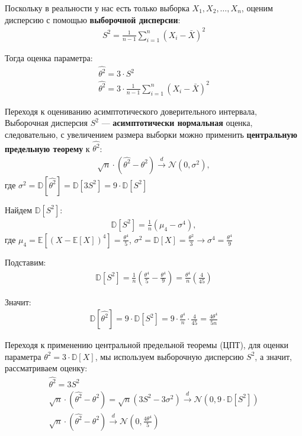 \documentclass[12pt]{article}
\begin{document}
	Поскольку в реальности у нас есть только выборка $ X_1, X_2, \dots, X_n $, оценим дисперсию с помощью \textbf{выборочной дисперсии}:
	\begin{gather*}
		S^2 = \frac{1}{n-1} \sum_{i=1}^{n} (X_i - \bar{X})^2
	\end{gather*}
	
	Тогда оценка параметра:
	\begin{gather*}
		\widehat{\theta^2} = 3 \cdot S^2 \\
		\widehat{\theta^2} = 3 \cdot \frac{1}{n-1} \sum_{i=1}^{n} (X_i - \bar{X})^2
	\end{gather*}
	
	Переходя к оцениванию асимптотического доверительного интервала, Выборочная дисперсия $ S^2 $ — \textbf{асимптотически нормальная} оценка, следовательно, с увеличением размера выборки можно применить \textbf{центральную предельную теорему} к $ \widehat{\theta^2} $:
	\begin{gather*}
		\sqrt{n} \cdot \left( \widehat{\theta^2} - \theta^2 \right) \overset{d}{\longrightarrow} \mathcal{N}\left(0, \sigma^2\right),
	\end{gather*}
	где $ \sigma^2 = \mathbb{D}[\widehat{\theta^2}] = \mathbb{D}[3S^2] = 9 \cdot \mathbb{D}[S^2] $
	\vspace{1em}
	
	Найдем $ \mathbb{D}[S^2] $:
	\begin{gather*}
		\mathbb{D}[S^2] = \frac{1}{n} \left( \mu_4 - \sigma^4 \right),
	\end{gather*}
	где $ \mu_4 = \mathbb{E}\left[(X - \mathbb{E}[X])^4\right] = \frac{\theta^4}{5} $, $ \sigma^2 = \mathbb{D}[X] = \frac{\theta^2}{3} {\longrightarrow} \sigma^4 = \frac{\theta^4}{9}$
	
	Подставим:
	\begin{gather*}
		\mathbb{D}[S^2] = \frac{1}{n} \left( \frac{\theta^4}{5} - \frac{\theta^4}{9} \right) = \frac{\theta^4}{n} \left( \frac{4}{45} \right)
	\end{gather*}
	
	Значит:
	\begin{gather*}
		\mathbb{D}[\widehat{\theta^2}] = 9 \cdot \mathbb{D}[S^2] = 9 \cdot \frac{\theta^4}{n} \cdot \frac{4}{45} = \frac{4 \theta^4}{5n}
	\end{gather*}
	
	Переходя к применению центральной предельной теоремы (ЦПТ), для оценки параметра $ \theta^2 = 3 \cdot \mathbb{D}[X] $, мы используем выборочную дисперсию $ S^2 $, а значит, рассматриваем оценку:
	\begin{gather*}
		\widehat{\theta^2} = 3S^2 \\
		\sqrt{n} \cdot (\widehat{\theta^2} - \theta^2) = \sqrt{n}(3S^2 - 3\sigma^2) \xrightarrow{d} \mathcal{N}(0, 9 \cdot \mathbb{D}[S^2]) \\
		\sqrt{n} \cdot \left(\widehat{\theta^2} - \theta^2 \right) \overset{d}{\longrightarrow} \mathcal{N}\left(0, \frac{4\theta^4}{5}\right)
	\end{gather*}
	
\end{document}
